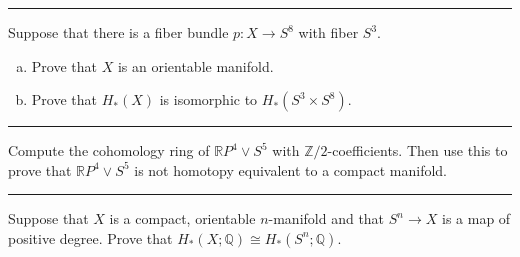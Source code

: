 \documentclass[letterpaper, 12pt]{article}
\begin{document}
\noindent\rule{7in}{2.8pt}
\begin{problem}{3}
Suppose that there is a fiber bundle \(p:X\rightarrow S^8\) with fiber \(S^3\). 
\begin{enumerate}[(a)]
\item Prove that \(X\) is an orientable manifold.
\item Prove that \(H_*(X)\) is isomorphic to \(H_*(S^3\times S^8)\). 
\end{enumerate}
\end{problem}
\begin{solution}

\end{solution}

\noindent\rule{7in}{2.8pt}
\begin{problem}{4}
Compute the cohomology ring of \(\mathbb{R}P^4\vee S^5\) with \(\mathbb{Z}/2\)-coefficients. Then use this to prove that \(\mathbb{R}P^4\vee S^5\) is not homotopy equivalent to a compact manifold. 
\end{problem}
\begin{solution}

\end{solution}

\noindent\rule{7in}{2.8pt}
\begin{problem}{5}
Suppose that \(X\) is a compact, orientable \(n\)-manifold and that \(S^n\rightarrow X\) is a map of positive degree. Prove that \(H_*(X;\mathbb{Q})\cong H_*(S^n;\mathbb{Q})\).
\end{problem}
\begin{solution}

\end{solution}
\end{document}
